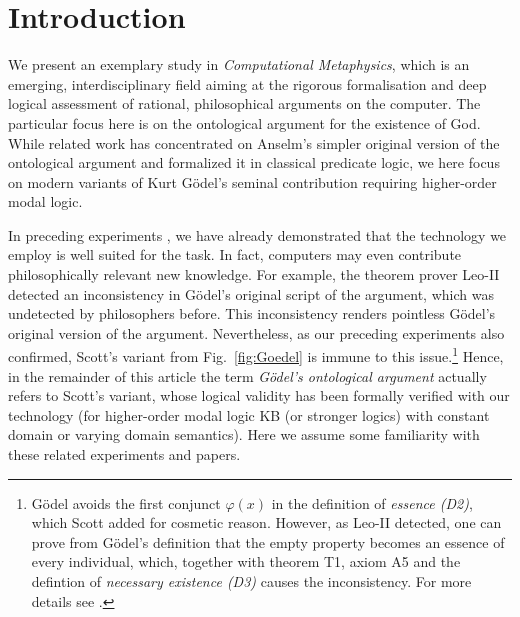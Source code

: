 \documentclass{birkjour}
\theoremstyle{definition}
\theoremstyle{remark}
\numberwithin{equation}{section}
\begin{document}
\section{Introduction}
We present an exemplary study in \emph{Computational Metaphysics},
which is an emerging, interdisciplinary field aiming at the rigorous
formalisation and deep logical assessment of rational, philosophical
arguments on the computer.  The particular focus here is on the
ontological argument for the existence of God.  While related work
\citep{oppenheimer11,rushby13} has concentrated on Anselm's simpler original
version of the ontological argument and formalized it in classical
predicate logic, we here focus on modern variants of Kurt Gödel's seminal contribution
\citep{GoedelNotes} requiring
higher-order modal logic. 


In preceding experiments \citep{C55,C40,J30}, we have already
demonstrated that the technology we employ is well suited for the
task. In fact, computers may even contribute philosophically relevant
new knowledge. For example, the theorem prover Leo-II \cite{Leo-II}
detected an inconsistency in Gödel's original script
\citep{GoedelNotes} of the argument, which was undetected by
philosophers before.  This inconsistency renders pointless Gödel's
original version of the argument. Nevertheless, as our
preceding experiments also confirmed, Scott's variant
\citep{ScottNotes} from Fig.~\ref{fig:Goedel} is immune to this
issue.\footnote{Gödel avoids the first conjunct $\varphi(x)$ in the
  definition of \emph{essence (D2)}, which Scott added for cosmetic
  reason. However, as Leo-II detected, one can prove from Gödel's
  definition that the empty property becomes an essence of every
  individual, which, together with theorem T1, axiom A5 and the
  defintion of \emph{necessary existence (D3)} causes the
  inconsistency. For more details see \citet{C55}.} Hence, in the
remainder of this article the term \emph{Gödel's ontological argument}
actually refers to Scott's variant, whose logical validity has been
formally 
verified with our technology (for higher-order modal
logic KB (or stronger logics) with constant domain or varying domain semantics). Here we
assume some familiarity with these related experiments and papers.
\end{document}
